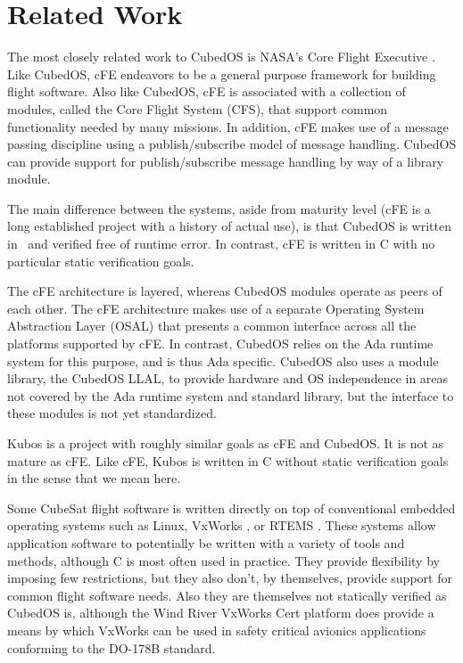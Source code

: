 
\section{Related Work}
\label{section-related-work}

The most closely related work to CubedOS is NASA's Core Flight Executive \cite{cFE}. Like
CubedOS, cFE endeavors to be a general purpose framework for building flight software. Also like
CubedOS, cFE is associated with a collection of modules, called the Core Flight System (CFS),
that support common functionality needed by many missions. In addition, cFE makes use of a
message passing discipline using a publish/subscribe model of message handling. CubedOS can
provide support for publish/subscribe message handling by way of a library module.

The main difference between the systems, aside from maturity level (cFE is a long established
project with a history of actual use), is that CubedOS is written in \SPARK\ and verified free
of runtime error. In contrast, cFE is written in C with no particular static verification goals.

The cFE architecture is layered, whereas CubedOS modules operate as peers of each other. The cFE
architecture makes use of a separate Operating System Abstraction Layer (OSAL) that presents a
common interface across all the platforms supported by cFE. In contrast, CubedOS relies on the
Ada runtime system for this purpose, and is thus Ada specific. CubedOS also uses a module
library, the CubedOS LLAL, to provide hardware and OS independence in areas not covered by the
Ada runtime system and standard library, but the interface to these modules is not yet
standardized.

Kubos \cite{kubos} is a project with roughly similar goals as cFE and CubedOS. It is not as
mature as cFE. Like cFE, Kubos is written in C without static verification goals in the sense
that we mean here.

Some CubeSat flight software is written directly on top of conventional embedded operating
systems such as Linux, VxWorks \cite{vxworks}, or RTEMS \cite{rtems}. These systems allow
application software to potentially be written with a variety of tools and methods, although C
is most often used in practice. They provide flexibility by imposing few restrictions, but they
also don't, by themselves, provide support for common flight software needs. Also they are
themselves not statically verified as CubedOS is, although the Wind River VxWorks Cert platform
\cite{vxworks-cert} does provide a means by which VxWorks can be used in safety critical
avionics applications conforming to the DO-178B standard.
